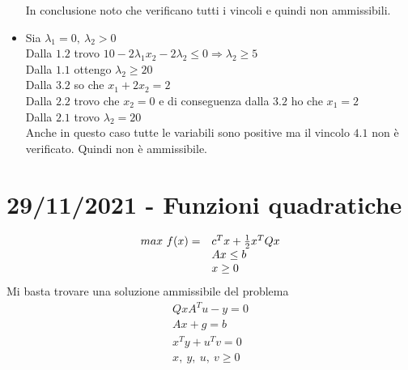 \documentclass[12pt,a4paper]{article}
\begin{document}
\begin{itemize}
In conclusione noto che verificano tutti i vincoli e quindi non ammissibili.
\item Sia $\lambda_1 =0,\ \lambda_2>0$\\
Dalla $1.2$ trovo $10-2\lambda_1x_2 - 2\lambda_2 \leq 0 \Rightarrow \lambda_2 \geq 5$\\
Dalla $1.1$ ottengo $\lambda_2 \geq 20$\\
Dalla $3.2$ so che $x_1+2x_2 = 2$\\
Dalla $2.2$ trovo che $x_2= 0$ e di conseguenza dalla $3.2$ ho che $x_1=2$\\
Dalla $2.1$ trovo $\lambda_2 = 20$\\
Anche in questo caso tutte le variabili sono positive ma il vincolo $4.1$ non è verificato. Quindi non è ammissibile.
\end{itemize}

\clearpage
\section{29/11/2021 - Funzioni quadratiche}
\begin{equation*}
\begin{array}{rl}
max \ f(x) = & c^Tx+{1\over2}x^TQx\\
& Ax \leq b\\
& x \geq 0
\end{array}
\end{equation*}
Mi basta trovare una soluzione ammissibile del problema
\begin{equation*}
\begin{array}{l}
QxA^Tu-y=0\\
Ax+g = b\\
x^Ty+u^Tv = 0\\
x,\ y,\ u,\ v \geq 0
\end{array}
\end{equation*}
\end{document}
